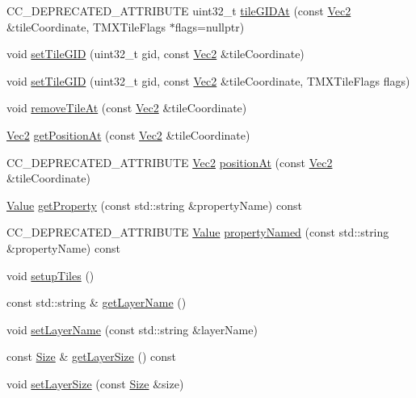 \begin{DoxyCompactItemize}
\item 
C\+C\+\_\+\+D\+E\+P\+R\+E\+C\+A\+T\+E\+D\+\_\+\+A\+T\+T\+R\+I\+B\+U\+TE uint32\+\_\+t \hyperlink{classTMXLayer_a244f8bff6274b630488bf6ebebdeee5a}{tile\+G\+I\+D\+At} (const \hyperlink{classVec2}{Vec2} \&tile\+Coordinate, T\+M\+X\+Tile\+Flags $\ast$flags=nullptr)
\item 
void \hyperlink{classTMXLayer_a6da5cb4f6fa4c0f1853f5030323dd759}{set\+Tile\+G\+ID} (uint32\+\_\+t gid, const \hyperlink{classVec2}{Vec2} \&tile\+Coordinate)
\item 
void \hyperlink{classTMXLayer_adfb01865934be28adc5f1b38876c7c4e}{set\+Tile\+G\+ID} (uint32\+\_\+t gid, const \hyperlink{classVec2}{Vec2} \&tile\+Coordinate, T\+M\+X\+Tile\+Flags flags)
\item 
void \hyperlink{classTMXLayer_a185ae1ff2a7ce7069e67362fb1faa930}{remove\+Tile\+At} (const \hyperlink{classVec2}{Vec2} \&tile\+Coordinate)
\item 
\hyperlink{classVec2}{Vec2} \hyperlink{classTMXLayer_a3b433e1831ed12ae032db0124f286470}{get\+Position\+At} (const \hyperlink{classVec2}{Vec2} \&tile\+Coordinate)
\item 
C\+C\+\_\+\+D\+E\+P\+R\+E\+C\+A\+T\+E\+D\+\_\+\+A\+T\+T\+R\+I\+B\+U\+TE \hyperlink{classVec2}{Vec2} \hyperlink{classTMXLayer_aac322f83e04e9efa5cb88b49d034b9f0}{position\+At} (const \hyperlink{classVec2}{Vec2} \&tile\+Coordinate)
\item 
\hyperlink{classValue}{Value} \hyperlink{classTMXLayer_a6ed296d4b13f396f00815266c74054ff}{get\+Property} (const std\+::string \&property\+Name) const
\item 
C\+C\+\_\+\+D\+E\+P\+R\+E\+C\+A\+T\+E\+D\+\_\+\+A\+T\+T\+R\+I\+B\+U\+TE \hyperlink{classValue}{Value} \hyperlink{classTMXLayer_af6fefaddaa8d6208b1d375f08e6d3ad6}{property\+Named} (const std\+::string \&property\+Name) const
\item 
void \hyperlink{classTMXLayer_acf9d1ea932daf85d00dce917e40049b7}{setup\+Tiles} ()
\item 
const std\+::string \& \hyperlink{classTMXLayer_a83d5647317c7be079f5034530ec1eaab}{get\+Layer\+Name} ()
\item 
void \hyperlink{classTMXLayer_a41ce08785e388b65e0f994781f45183d}{set\+Layer\+Name} (const std\+::string \&layer\+Name)
\item 
const \hyperlink{classSize}{Size} \& \hyperlink{classTMXLayer_a33aa146a907ade5080f67817ee8f552d}{get\+Layer\+Size} () const
\item 
void \hyperlink{classTMXLayer_a4967459155b855cfa403d2fbb4b6f7c1}{set\+Layer\+Size} (const \hyperlink{classSize}{Size} \&size)

\end{DoxyCompactItemize}
